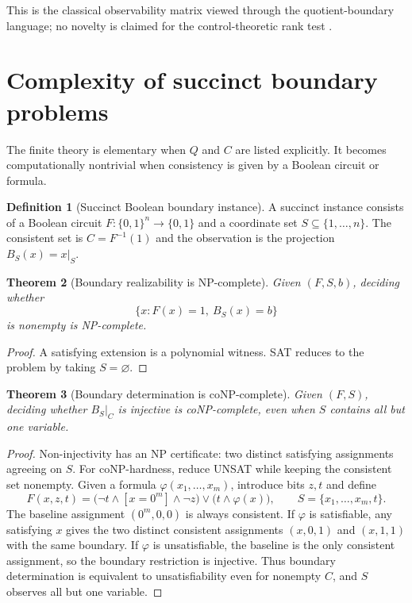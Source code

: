 \documentclass[11pt]{article}
\newtheorem{theorem}{Theorem}[section]
\theoremstyle{definition}
\newtheorem{definition}[theorem]{Definition}
\theoremstyle{remark}
\numberwithin{equation}{section}
\begin{document}
This is the classical observability matrix viewed through the quotient-boundary language; no novelty is claimed for the control-theoretic rank test \citep{Kailath1980}.

\section{Complexity of succinct boundary problems}\label{sec:complexity}

The finite theory is elementary when $Q$ and $C$ are listed explicitly.  It becomes computationally nontrivial when consistency is given by a Boolean circuit or formula.

\begin{definition}[Succinct Boolean boundary instance]
A succinct instance consists of a Boolean circuit $F:\{0,1\}^n\to\{0,1\}$ and a coordinate set $S\subseteq\{1,\ldots,n\}$.  The consistent set is $C=F^{-1}(1)$ and the observation is the projection $B_S(x)=x|_S$.
\end{definition}

\begin{theorem}[Boundary realizability is NP-complete]\label{thm:realizability-complexity}
Given $(F,S,b)$, deciding whether
\[
 \{x:F(x)=1,\ B_S(x)=b\}
\]
is nonempty is NP-complete.
\end{theorem}

\begin{proof}
A satisfying extension is a polynomial witness.  SAT reduces to the problem by taking $S=\varnothing$.
\end{proof}

\begin{theorem}[Boundary determination is coNP-complete]\label{thm:injectivity-complexity}
Given $(F,S)$, deciding whether $B_S|_C$ is injective is coNP-complete, even when $S$ contains all but one variable.
\end{theorem}

\begin{proof}
Non-injectivity has an NP certificate: two distinct satisfying assignments agreeing on $S$.  For coNP-hardness, reduce UNSAT while keeping the consistent set nonempty.  Given a formula $\varphi(x_1,\ldots,x_m)$, introduce bits $z,t$ and define
\[
 F(x,z,t)=
 \bigl(\neg t\wedge[x=0^m]\wedge\neg z\bigr)
 \vee
 \bigl(t\wedge\varphi(x)\bigr),
 \qquad
 S=\{x_1,\ldots,x_m,t\}.
\]
The baseline assignment $(0^m,0,0)$ is always consistent.  If $\varphi$ is satisfiable, any satisfying $x$ gives the two distinct consistent assignments $(x,0,1)$ and $(x,1,1)$ with the same boundary.  If $\varphi$ is unsatisfiable, the baseline is the only consistent assignment, so the boundary restriction is injective.  Thus boundary determination is equivalent to unsatisfiability even for nonempty $C$, and $S$ observes all but one variable.
\end{proof}
\end{document}
